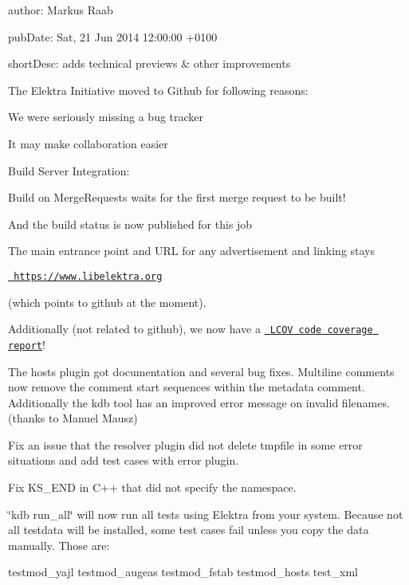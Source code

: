 
\begin{DoxyItemize}
\item author\+: Markus Raab
\item pub\+Date\+: Sat, 21 Jun 2014 12\+:00\+:00 +0100
\item short\+Desc\+: adds technical previews \& other improvements
\end{DoxyItemize}

The Elektra Initiative moved to Github for following reasons\+:


\begin{DoxyItemize}
\item We were seriously missing a bug tracker
\item It may make collaboration easier
\item Build Server Integration\+:
\begin{DoxyItemize}
\item Build on Merge\+Requests waits for the first merge request to be built!
\item And the build status is now published for this job
\end{DoxyItemize}
\end{DoxyItemize}

The main entrance point and U\+RL for any advertisement and linking stays

\href{https://www.libelektra.org}{\texttt{ https\+://www.\+libelektra.\+org}}

(which points to github at the moment).

Additionally (not related to github), we now have a \href{https://doc.libelektra.org/coverage/master/debian-buster-full}{\texttt{ L\+C\+OV code coverage report}}!

The hosts plugin got documentation and several bug fixes. Multiline comments now remove the comment start sequences within the metadata comment. Additionally the kdb tool has an improved error message on invalid filenames. (thanks to Manuel Mausz)

Fix an issue that the resolver plugin did not delete tmpfile in some error situations and add test cases with error plugin.

Fix K\+S\+\_\+\+E\+ND in C++ that did not specify the namespace.

\char`\"{}kdb run\+\_\+all\char`\"{} will now run all tests using Elektra from your system. Because not all testdata will be installed, some test cases fail unless you copy the data manually. Those are\+: \begin{DoxyVerb}testmod_yajl testmod_augeas testmod_fstab testmod_hosts test_xml
\end{DoxyVerb}



